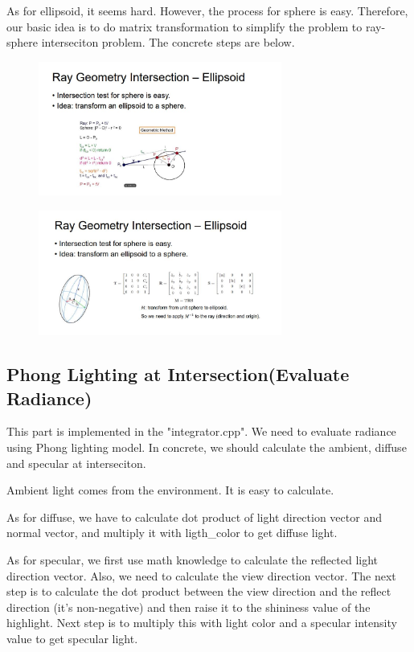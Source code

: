 \documentclass[acmtog]{acmart}
\begin{document}
As for ellipsoid, it seems hard. However, the process for sphere is easy.
Therefore, our basic idea is to do matrix transformation to simplify the problem to ray-sphere interseciton problem. 
The concrete steps are below.

\begin{figure}[h]
	\centering
	{\includegraphics[width=8cm]{e1.JPG}}	
\end{figure}


\begin{figure}[h]
	\centering
	{\includegraphics[width=8cm]{e2.JPG}}	
\end{figure}


\subsection{Phong Lighting at Intersection(Evaluate Radiance)}
\quad This part is implemented in the "integrator.cpp". We need to evaluate radiance using Phong lighting model.
In concrete, we should calculate the ambient, diffuse and specular at interseciton.


Ambient light comes from the environment. It is easy to calculate.


As for diffuse, we have to calculate dot product of light direction vector and normal vector, and multiply it with ligth\_color to get diffuse light.


As for specular, we first use math knowledge to calculate the reflected light direction vector. Also, we need to calculate the view direction vector. 
The next step is to calculate the dot product between the view direction and the reflect direction (it's non-negative) and then raise it to the shininess value of the highlight.
Next step is to multiply this with light color and a specular intensity value to get specular light.
\end{document}
